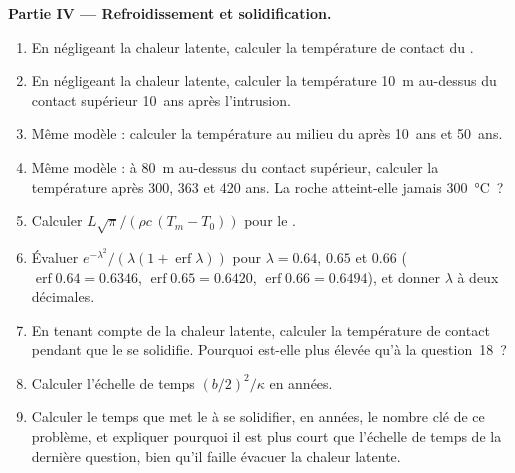 \begin{problem}
\noindent\textbf{Partie IV --- Refroidissement et solidification.}
\begin{enumerate}[resume]
\item En négligeant la chaleur latente, calculer la température de contact du .
\item En négligeant la chaleur latente, calculer la température \qty{10}{m} au-dessus du
contact supérieur \num{10}~ans après l'intrusion.
\item Même modèle : calculer la température au milieu du  après
\num{10}~ans et \num{50}~ans.
\item Même modèle : à \qty{80}{m} au-dessus du contact supérieur, calculer la température après
\num{300}, \num{363} et \num{420} ans. La roche atteint-elle jamais
\qty{300}{\celsius}~?
\item Calculer $L\sqrt\pi/(\rho c\,(T_m - T_0))$ pour le .
\item Évaluer $e^{-\lambda^2}/(\lambda(1 + \operatorname{erf}\lambda))$ pour $\lambda = 0.64$,
$0.65$ et $0.66$ ($\operatorname{erf}0.64 = 0.6346$, $\operatorname{erf}0.65 = 0.6420$,
$\operatorname{erf}0.66 = 0.6494$), et donner $\lambda$ à deux décimales.
\item En tenant compte de la chaleur latente, calculer la température de contact pendant que le 
se solidifie. Pourquoi est-elle plus élevée qu'à la question~18~?
\item Calculer l'échelle de temps $(b/2)^2/\kappa$ en années.
\item Calculer le temps que met le  à se solidifier, en années, le nombre clé de
ce problème, et expliquer pourquoi il est plus court que l'échelle de temps de la dernière
question, bien qu'il faille évacuer la chaleur latente.
\end{enumerate}
\end{problem}
